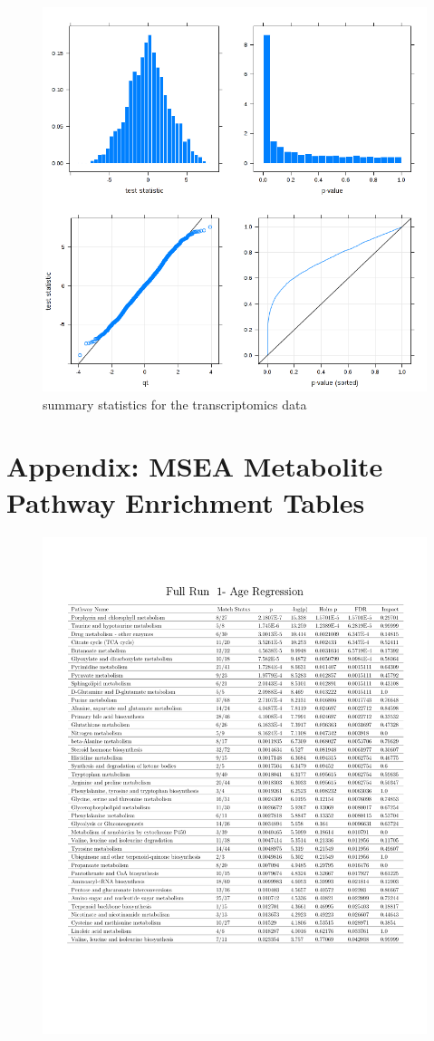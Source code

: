 \documentclass[a4paper,11pt,twoside]{book}
\begin{document}
\begin{subappendices}
\begin{figure}[ht]
	\includegraphics[width=0.8\linewidth]{Appendix_FIgures/protomics_overview_statistics.png}
	\caption{summary statistics for the transcriptomics data}
\end{figure}
\clearpage


\section{Appendix: MSEA Metabolite Pathway Enrichment Tables }

\begin{figure}
	\centering
	\includegraphics[width=\linewidth]{3.Metabolomics/MSEA_charts_1.pdf}
\end{figure}


\end{subappendices}
\end{document}
